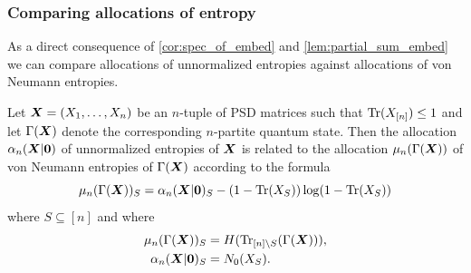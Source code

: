 \documentclass[notitlepage, 10pt]{article}
\begin{document}
\subsubsection{Comparing allocations of entropy}

As a direct consequence of \cref{cor:spec_of_embed} and \cref{lem:partial_sum_embed} we can compare allocations of unnormalized entropies against allocations of von Neumann entropies.
\begin{cor}
    Let $\boldsymbol{X} = (X_1, \ldots, X_n)$ be an $n$-tuple of PSD matrices such that $\operatorname{Tr}(X_{[n]}) \leq 1$ and let $\Gamma(\boldsymbol{X})$ denote the corresponding $n$-partite quantum state.
    Then the allocation $\alpha_n(\boldsymbol{X}|\boldsymbol{0})$ of unnormalized entropies of $\boldsymbol{X}$ is related to the allocation $\mu_n(\Gamma(\boldsymbol{X}))$ of von Neumann entropies of $\Gamma(\boldsymbol{X})$ according to the formula
    \begin{equation}
          \mu_n(\Gamma(\boldsymbol{X}))_S = \alpha_n(\boldsymbol{X}|\boldsymbol{0})_S - (1-\operatorname{Tr}(X_S))\log(1-\operatorname{Tr}(X_S))
    \end{equation}
    where $S \subseteq [n]$ and where
    \begin{align}
        \mu_n(\Gamma(\boldsymbol{X}))_S &= H(\operatorname{Tr}_{[n]\setminus S}(\Gamma(\boldsymbol{X}))),\\
        \alpha_n(\boldsymbol{X}|\boldsymbol{0})_S &= N_0(X_S).
    \end{align}
\end{cor}
\end{document}
